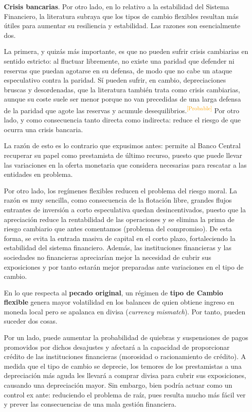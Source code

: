 \documentclass[10pt,a4paper]{article}
\begin{document}
\textbf{Crisis bancarias}. Por otro lado, en lo relativo a la estabilidad del Sistema Financiero, la literatura subraya que los tipos de cambio flexibles resultan más útiles para aumentar su resiliencia y estabilidad. Las razones son esencialmente dos. 

La primera, y quizás más importante, es que no pueden sufrir crisis cambiarias en sentido estricto: al fluctuar libremente, no existe una paridad que defender ni reservas que puedan agotarse en su defensa, de modo que no cabe un ataque especulativo contra la paridad. Sí pueden sufrir, en cambio, depreciaciones bruscas y desordenadas, que la literatura también trata como crisis cambiarias, aunque su coste suele ser menor porque no van precedidas de una larga defensa de la paridad que agote las reservas y acumule desequilibrios.\textcolor{orange}{\textsuperscript{[Probable]}} Por otro lado, y como consecuencia tanto directa como indirecta: reduce el riesgo de que ocurra una crisis bancaria.

La razón de esto es lo contrario que expusimos antes: permite al Banco Central recuperar su papel como prestamista de último recurso, puesto que puede llevar las variaciones en la oferta monetaria que considera necesarias para rescatar a las entidades en problema. 

Por otro lado, los regímenes flexibles reducen el problema del riesgo moral. La razón es muy sencilla, como consecuencia de la flotación libre, grandes flujos entrantes de inversión a corto especulativa quedan desincentivados, puesto que la apreciación reduce la rentabilidad de las operaciones y se elimina la prima de riesgo cambiario que antes comentamos (problema del compromiso). De esta forma, se evita la entrada masiva de capital en el corto plazo, fortaleciendo la estabilidad del sistema financiero. Además, las instituciones financieras y las sociedades no financieras apreciarían mejor la necesidad de cubrir sus exposiciones y por tanto estarán mejor preparadas ante variaciones en el tipo de cambio. 

En lo que respecta al \textbf{pecado original}, un régimen de \textbf{tipo de Cambio flexible} genera mayor volatilidad en los balances de quien obtiene ingreso en moneda local pero se apalanca en divisa (\textit{currency mismatch}). Por tanto, pueden suceder dos cosas. 

Por un lado, puede aumentar la probabilidad de quiebras y suspensiones de pagos promovidos por dichos desajustes y afectará a la capacidad de proporcionar crédito de las instituciones financieras (morosidad o racionamiento de crédito). A medida que el tipo de cambio se deprecie, los temores de los prestamistas a una depreciación más aguda les llevará a comprar divisa para cubrir sus exposiciones, causando una depreciación mayor. Sin embargo, bien podría actuar como un control ex ante: reduciendo el problema de raíz, pues resulta mucho más fácil ver y prever las consecuencias de una mala gestión financiera. 
\end{document}
